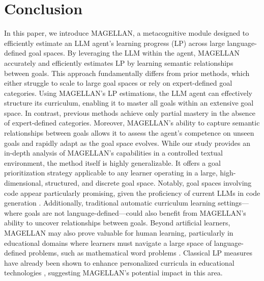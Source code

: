 \documentclass{article}
\begin{document}
\section{Conclusion}
\label{sec:conclusion}
In this paper, we introduce MAGELLAN, a metacognitive module designed to efficiently estimate an LLM agent's learning progress (LP) across large language-defined goal spaces. By leveraging the LLM within the agent, MAGELLAN accurately and efficiently estimates LP by learning semantic relationships between goals. This approach fundamentally differs from prior methods, which either struggle to scale to large goal spaces or rely on expert-defined goal categories. Using MAGELLAN's LP estimations, the LLM agent can effectively structure its curriculum, enabling it to master all goals within an extensive goal space. In contrast, previous methods achieve only partial mastery in the absence of expert-defined categories. Moreover, MAGELLAN’s ability to capture semantic relationships between goals allows it to assess the agent’s competence on unseen goals and rapidly adapt as the goal space evolves. While our study provides an in-depth analysis of MAGELLAN’s capabilities in a controlled textual environment, the method itself is highly generalizable. It offers a goal prioritization strategy applicable to any learner operating in a large, high-dimensional, structured, and discrete goal space. Notably, goal spaces involving code appear particularly promising, given the proficiency of current LLMs in code generation \cite{wang_voyager_2023, pourcel_aces_2024}. Additionally, traditional automatic curriculum learning settings—where goals are not language-defined—could also benefit from MAGELLAN’s ability to uncover relationships between goals. Beyond artificial learners, MAGELLAN may also prove valuable for human learning, particularly in educational domains where learners must navigate a large space of language-defined problems, such as mathematical word problems \cite{doroudi2019s}. Classical LP measures have already been shown to enhance personalized curricula in educational technologies \cite{clement2015multi}, suggesting MAGELLAN’s potential impact in this area.
\end{document}
